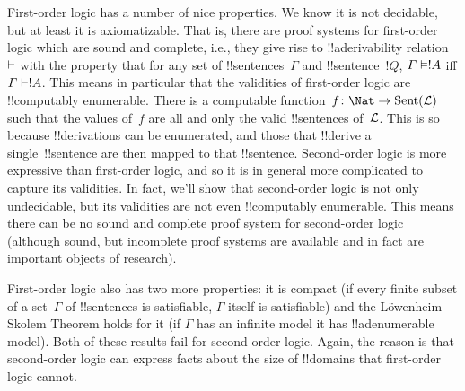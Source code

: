\documentclass[../../../include/open-logic-section]{subfiles}
\begin{document}


First-order logic has a number of nice properties. We know it is not
decidable, but at least it is axiomatizable. That is, there are proof
systems for first-order logic which are sound and complete, i.e., they
give rise to !!a{derivability} relation~$\Proves$ with the property
that for any set of !!{sentence}s~$\Gamma$ and !!{sentence}~$!Q$,
$\Gamma \Entails !A$ iff $\Gamma \Proves !A$.  This means in
particular that the validities of first-order logic are !!{computably
  enumerable}. There is a computable function~$f\colon \Nat \to
\Sent[L]$ such that the values of~$f$ are all and only the valid
!!{sentence}s of~$\Lang{L}$. This is so because !!{derivation}s can be
enumerated, and those that !!{derive} a single~!!{sentence} are then
mapped to that !!{sentence}.  Second-order logic is more expressive
than first-order logic, and so it is in general more complicated to
capture its validities.  In fact, we'll show that second-order logic
is not only undecidable, but its validities are not even !!{computably
  enumerable}. This means there can be no sound and complete proof
system for second-order logic (although sound, but incomplete proof
systems are available and in fact are important objects of research).

First-order logic also has two more properties: it is compact (if
every finite subset of a set~$\Gamma$ of !!{sentence}s is satisfiable,
$\Gamma$ itself is satisfiable) and the L\"owenheim-Skolem Theorem
holds for it (if $\Gamma$ has an infinite model it has
!!a{denumerable} model). Both of these results fail for second-order
logic. Again, the reason is that second-order logic can express facts
about the size of !!{domain}s that first-order logic cannot.
\end{document}
